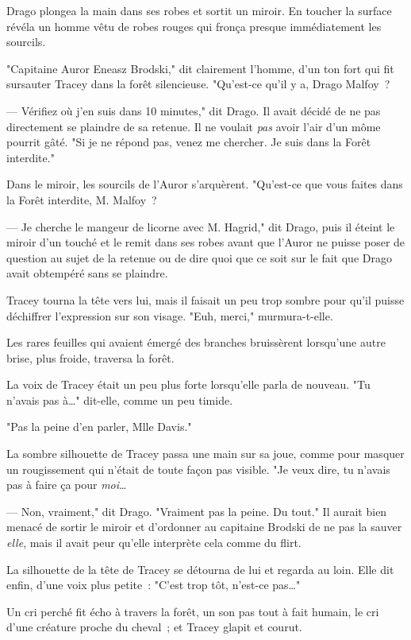 Drago plongea la main dans ses robes et sortit un miroir. En toucher la surface révéla un homme vêtu de robes rouges qui fronça presque immédiatement les sourcils.

"Capitaine Auror Eneasz Brodski," dit clairement l'homme, d'un ton fort qui fit sursauter Tracey dans la forêt silencieuse. "Qu'est-ce qu'il y a, Drago Malfoy~?

--- Vérifiez où j'en suis dans 10 minutes," dit Drago. Il avait décidé de ne pas directement se plaindre de sa retenue. Il ne voulait \emph{pas} avoir l'air d'un môme pourrit gâté. "Si je ne répond pas, venez me chercher. Je suis dans la Forêt interdite."

Dans le miroir, les sourcils de l'Auror s'arquèrent. "Qu'est-ce que vous faites dans la Forêt interdite, M. Malfoy~?

--- Je cherche le mangeur de licorne avec M. Hagrid," dit Drago, puis il éteint le miroir d'un touché et le remit dans ses robes avant que l'Auror ne puisse poser de question au sujet de la retenue ou de dire quoi que ce soit sur le fait que Drago avait obtempéré sans se plaindre.

Tracey tourna la tête vers lui, mais il faisait un peu trop sombre pour qu'il puisse déchiffrer l'expression sur son visage. "Euh, merci," murmura-t-elle.

Les rares feuilles qui avaient émergé des branches bruissèrent lorsqu'une autre brise, plus froide, traversa la forêt.

La voix de Tracey était un peu plus forte lorsqu'elle parla de nouveau. "Tu n'avais pas à…" dit-elle, comme un peu timide.

"Pas la peine d'en parler, Mlle Davis."

La sombre silhouette de Tracey passa une main sur sa joue, comme pour masquer un rougissement qui n'était de toute façon pas visible. "Je veux dire, tu n'avais pas à faire ça pour \emph{moi}…

--- Non, vraiment," dit Drago. "Vraiment pas la peine. Du tout." Il aurait bien menacé de sortir le miroir et d'ordonner au capitaine Brodski de ne pas la sauver \emph{elle}, mais il avait peur qu'elle interprète cela comme du flirt.

La silhouette de la tête de Tracey se détourna de lui et regarda au loin. Elle dit enfin, d'une voix plus petite~: "C'est trop tôt, n'est-ce pas…"

Un cri perché fit écho à travers la forêt, un son pas tout à fait humain, le cri d'une créature proche du cheval~; et Tracey glapit et courut.

